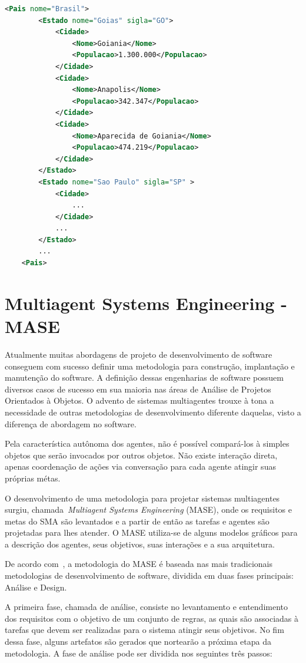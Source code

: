 \begin{lstlisting}[language=xml,label=code:exemplo-xml,caption=Exemplo de código XML representando uma ontologia simples de cidades.]
	<Pais nome="Brasil">
		<Estado nome="Goias" sigla="GO">
			<Cidade>
				<Nome>Goiania</Nome>
				<Populacao>1.300.000</Populacao>
			</Cidade>
			<Cidade>
				<Nome>Anapolis</Nome>
				<Populacao>342.347</Populacao>
			</Cidade>
			<Cidade>
				<Nome>Aparecida de Goiania</Nome>
				<Populacao>474.219</Populacao>
			</Cidade>
		</Estado>
		<Estado nome="Sao Paulo" sigla="SP" >
			<Cidade>
				...
			</Cidade>
			...
		</Estado>
		...
	<Pais>
\end{lstlisting}


\section{Multiagent Systems Engineering - MASE}\label{section:mase}

Atualmente muitas abordagens de projeto de desenvolvimento de software conseguem com sucesso definir uma metodologia para construção, implantação e manutenção do software. A definição dessas engenharias de software possuem diversos casos de sucesso em sua maioria nas áreas de Análise de Projetos Orientados à Objetos. O advento de sistemas multiagentes trouxe à tona a necessidade de outras metodologias de desenvolvimento diferente daquelas, visto a diferença de abordagem no software.

Pela característica autônoma dos agentes, não é possível compará-los à simples objetos que serão invocados por outros objetos. Não existe interação direta, apenas coordenação de ações via conversação para cada agente atingir suas próprias métas.

O desenvolvimento de uma metodologia para projetar sistemas multiagentes surgiu, chamada~\emph{Multiagent Systems Engineering} (MASE), onde os requisitos e metas do SMA são levantados e a partir de então as tarefas e agentes são projetadas para lhes atender. O MASE utiliza-se de alguns modelos gráficos para a descrição dos agentes, seus objetivos, suas interações e a sua arquitetura.

De acordo com~\cite{scott01}, a metodologia do MASE é baseada nas mais tradicionais metodologias de desenvolvimento de software, dividida em duas fases principais: Análise e Design.

A primeira fase, chamada de análise, consiste no levantamento e entendimento dos requisitos com o objetivo de um conjunto de regras, as quais são associadas à tarefas que devem ser realizadas para o sistema atingir seus objetivos. No fim dessa fase, alguns artefatos são gerados que nortearão a próxima etapa da metodologia. A fase de análise pode ser dividida nos seguintes três passos:

